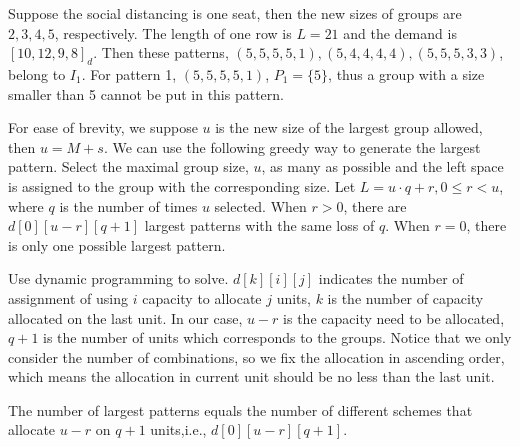 
\begin{example}
  Suppose the social distancing is one seat, then the new sizes of groups are $2, 3, 4, 5$, respectively. The length of one row is $L = 21$ and the demand is $[10, 12, 9, 8]_d$. Then these patterns, $(5, 5, 5, 5, 1), (5, 4, 4, 4, 4),(5, 5, 5, 3, 3)$, belong to $I_1$. For pattern 1, $(5, 5, 5, 5, 1)$, $P_{1} = \{5\}$, thus a group with a size smaller than 5 cannot be put in this pattern.
\end{example}


For ease of brevity, we suppose $u$ is the new size of the largest group allowed, then $u = M+s$.
We can use the following greedy way to generate the largest pattern. Select the maximal group size, $u$, as many as possible and the left space is assigned to the group with the corresponding size. Let $L = u\cdot q + r, 0 \leq r < u$, where $q$ is the number of times $u$ selected. When $r>0$, there are $d[0][u-r][q+1]$ largest patterns with the same loss of $q$. When $r =0$, there is only one possible largest pattern.


Use dynamic programming to solve. $d[k][i][j]$ indicates the number of assignment of using $i$ capacity to allocate $j$ units, $k$ is the number of capacity allocated on the last unit. In our case, $u-r$ is the capacity need to be allocated, $q+1$ is the number of units which corresponds to the groups. Notice that we only consider the number of combinations, so we fix the allocation in ascending order, which means the allocation in current unit should be no less than the last unit.  

The number of largest patterns equals the number of different schemes that allocate $u-r$ on $q+1$ units,i.e., $d[0][u-r][q+1]$.

